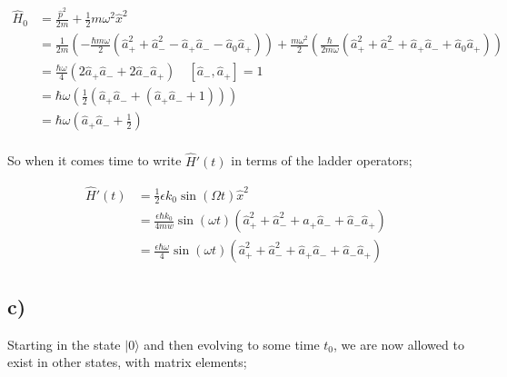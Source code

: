 \documentclass{article}
\newcommand{\p}[1]{\left(#1\right)}
\newcommand{\braket}[1]{\langle#1\rangle}
\begin{document}
\begin{align*}
    \hat{H}_0&=\frac{\hat{p}^2}{2m}+\frac{1}{2}m\omega^2\hat{x}^2\\[1em]
    &=\frac{1}{2m}\p{-\frac{\hbar{m}\omega}{2}\p{\hat{a}_{+}^2+\hat{a}_{-}^2-\hat{a}_{+}\hat{a}_{-}-\hat{a}_{0}\hat{a}_{+}}}+\frac{m\omega^2}{2}\p{\frac{\hbar}{2m\omega}\p{\hat{a}_{+}^2+\hat{a}_{-}^2+\hat{a}_{+}\hat{a}_{-}+\hat{a}_{0}\hat{a}_{+}}}\\[1em]
    &=\frac{\hbar\omega}{4}\p{2\hat{a}_{+}\hat{a}_{-}+2\hat{a}_{-}\hat{a}_{+}}\quad[\hat{a}_{-},\hat{a}_{+}]=1\\[1em]
    &=\hbar\omega\p{\frac{1}{2}\p{\hat{a}_{+}\hat{a}_{-}+\p{\hat{a}_{+}\hat{a}_{-}+1}}}\\[1em]
    &=\hbar\omega\p{\hat{a}_{+}\hat{a}_{-}+\frac{1}{2}}\\[1em]
\end{align*}

So when it comes time to write $\hat{H}'(t)$ in terms of the ladder operators;

\begin{align*}
    \hat{H}'(t)&=\frac{1}{2}\epsilon{k_0}\sin\p{{\Omega{t}}}\hat{x}^2\\[1em]
    &=\frac{\epsilon\hbar{k}_0}{4mw}\sin(\omega{t})(\hat{a}_{+}^2+\hat{a}_{-}^2+\hat{a}_{+}\hat{a}_{-}+\hat{a}_{-}\hat{a}_{+})\\[1em]
    &=\frac{\epsilon\hbar\omega}{4}\sin(\omega{t})(\hat{a}_{+}^2+\hat{a}_{-}^2+\hat{a}_{+}\hat{a}_{-}+\hat{a}_{-}\hat{a}_{+})
\end{align*}


\subsection*{c)}

Starting in the state $|0\rangle$ and then evolving to some time $t_0$, we are now allowed to exist in other states, with matrix elements; 

\end{document}

